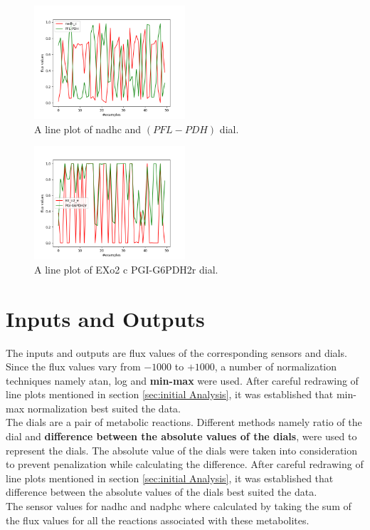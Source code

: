 \documentclass[12pt,chapterheads]{ucsd}
\begin{document}
\begin{figure}[h] 
\centering
\includegraphics[width=0.5\textwidth]{Figures/nadh_c_PFL_PDH_lineplot_50}
\caption[nadh \textunderscore c with PFL-PDH line plot]
{A line plot of nadh\textunderscore c and $(PFL-PDH)$ dial.}
\label{fig:nadhline}
\end{figure}

\begin{figure}[h] 
\centering
\includegraphics[width=0.5\textwidth]{Figures/EX_o2_e_PGI_G6PDH2r_lineplot_50}
\caption[EX\textunderscore o2 \textunderscore c with PGI-G6PDH2r line plot]
{A line plot of EX\textunderscore o2 \textunderscore c PGI-G6PDH2r dial.}
\label{fig:o2pgiline}
\end{figure}

\section{Inputs and Outputs}
The inputs and outputs are flux values of the corresponding sensors and dials.\\ 
Since the flux values vary from $-1000$ to $+1000$, a number of normalization techniques namely atan, log and \textbf{min-max} were used. After careful redrawing of line plots mentioned in section \ref{sec:initial Analysis}, it was established that min-max normalization best suited the data.\\
The dials are a pair of metabolic reactions. Different methods namely ratio of the dial and \textbf{difference between the absolute values of the dials}, were used to represent the dials. The absolute value of the dials were taken into consideration to prevent penalization while calculating the difference. After careful redrawing of line plots mentioned in section \ref{sec:initial Analysis}, it was established that difference between the absolute values of the dials best suited the data.\\
The sensor values for nadh\textunderscore c and nadph\textunderscore c where calculated by taking the sum of the flux values for all the reactions associated with these metabolites. 
\end{document}
